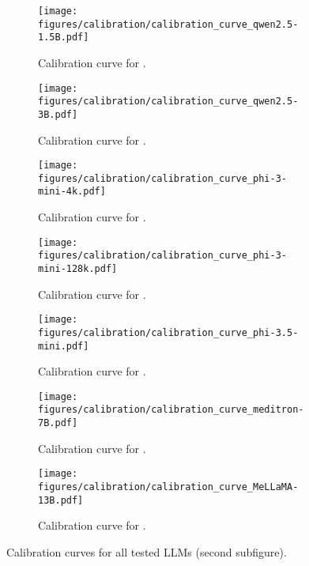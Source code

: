 \begin{figure}[htbp]
    \centering

    \begin{subfigure}{0.233\textwidth}
        \centering
        \texttt{[image: figures/calibration/calibration\_curve\_qwen2.5-1.5B.pdf]}
        \caption{Calibration curve for \qwenb.}
        \label{fig:app_cal_fig7}
    \end{subfigure}
    \hfill
    \begin{subfigure}{0.233\textwidth}
        \centering
        \texttt{[image: figures/calibration/calibration\_curve\_qwen2.5-3B.pdf]}
        \caption{Calibration curve for \qwenc.}
        \label{fig:app_cal_fig8}
    \end{subfigure}

    \vspace{0.5cm}
    
    \begin{subfigure}{0.233\textwidth}
        \centering
        \texttt{[image: figures/calibration/calibration\_curve\_phi-3-mini-4k.pdf]}
        \caption{Calibration curve for \phia.}
        \label{fig:app_cal_fig9}
    \end{subfigure}
    \hfill
    \begin{subfigure}{0.233\textwidth}
        \centering
        \texttt{[image: figures/calibration/calibration\_curve\_phi-3-mini-128k.pdf]}
        \caption{Calibration curve for \phib.}
        \label{fig:app_cal_fig10}
    \end{subfigure}

    \vspace{0.5cm}

    \begin{subfigure}{0.233\textwidth}
        \centering
        \texttt{[image: figures/calibration/calibration\_curve\_phi-3.5-mini.pdf]}
        \caption{Calibration curve for \phic.}
        \label{fig:app_cal_fig11}
    \end{subfigure}
    \hfill
    \begin{subfigure}{0.233\textwidth}
        \centering
        \texttt{[image: figures/calibration/calibration\_curve\_meditron-7B.pdf]}
        \caption{Calibration curve for \meditron.}
        \label{fig:app_cal_fig12}
    \end{subfigure}
    
    \vspace{0.5cm}

    \begin{subfigure}{0.233\textwidth}
        \centering
        \texttt{[image: figures/calibration/calibration\_curve\_MeLLaMA-13B.pdf]}
        \caption{Calibration curve for \mellama.}
        \label{fig:app_cal_fig13}
    \end{subfigure}

    
    \caption{Calibration curves for all tested LLMs (second subfigure).}
    \label{fig:app_calibration_curve_2}
\end{figure}
